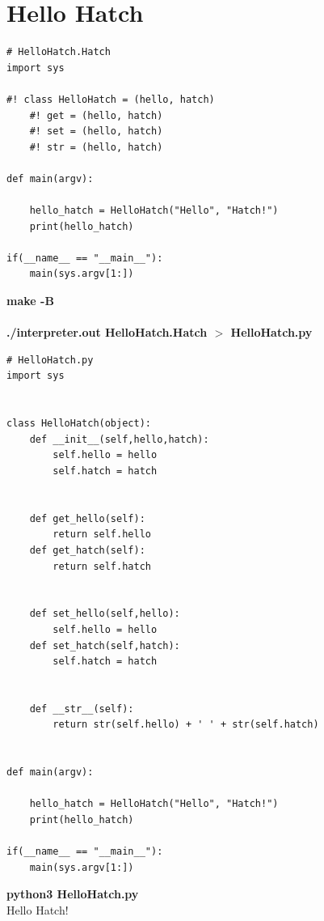 \documentclass[12pt]{article}
\begin{document}
\section{Hello Hatch}

\begin{lstlisting}
# HelloHatch.Hatch
import sys

#! class HelloHatch = (hello, hatch)
	#! get = (hello, hatch)
	#! set = (hello, hatch)
	#! str = (hello, hatch)

def main(argv):

	hello_hatch = HelloHatch("Hello", "Hatch!")
	print(hello_hatch)
	
if(__name__ == "__main__"):
	main(sys.argv[1:])

\end{lstlisting}
\textbf{make -B} \\ \\
\textbf{./interpreter.out HelloHatch.Hatch $>$ HelloHatch.py} \\
\begin{lstlisting}
# HelloHatch.py
import sys

     
class HelloHatch(object):
	def __init__(self,hello,hatch):
		self.hello = hello
		self.hatch = hatch

    
	def get_hello(self):
		return self.hello
	def get_hatch(self):
		return self.hatch

    
	def set_hello(self,hello):
		self.hello = hello
	def set_hatch(self,hatch):
		self.hatch = hatch

    
	def __str__(self):
		return str(self.hello) + ' ' + str(self.hatch)


def main(argv):

	hello_hatch = HelloHatch("Hello", "Hatch!")
	print(hello_hatch)

if(__name__ == "__main__"):
	main(sys.argv[1:])
\end{lstlisting}

\textbf{python3 HelloHatch.py} \\

Hello Hatch!
\end{document}
